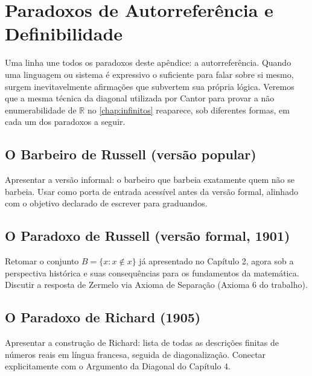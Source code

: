 \chapter{Paradoxos de Autorreferência e Definibilidade}
\label{chap:apendiceAutorreferenciaDefinibilidade}

Uma linha une todos os paradoxos deste apêndice: a autorreferência. Quando uma linguagem ou sistema é expressivo o suficiente para falar sobre si mesmo, surgem inevitavelmente afirmações que subvertem sua própria lógica. Veremos que a mesma técnica da diagonal utilizada por Cantor para provar a não enumerabilidade de \(\mathbb{R}\) no \autoref{chap:infinitos} reaparece, sob diferentes formas, em cada um dos paradoxos a seguir.

\section{O Barbeiro de Russell (versão popular)}

Apresentar a versão informal: o barbeiro que barbeia exatamente quem
não se barbeia. Usar como porta de entrada acessível antes da versão
formal, alinhado com o objetivo declarado de escrever para graduandos.


\section{O Paradoxo de Russell (versão formal, 1901)}

Retomar o conjunto \(B = \{x : x \not\in x\}\) já apresentado no Capítulo 2,
agora sob a perspectiva histórica e suas consequências para os
fundamentos da matemática. Discutir a resposta de Zermelo via
Axioma de Separação (Axioma 6 do trabalho).


\section{O Paradoxo de Richard (1905)}

Apresentar a construção de Richard: lista de todas as descrições finitas
de números reais em língua francesa, seguida de diagonalização.
Conectar explicitamente com o Argumento da Diagonal do Capítulo 4.


